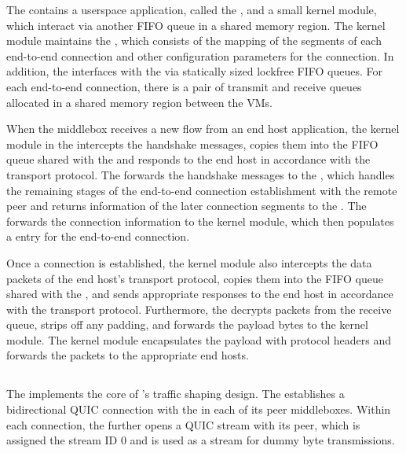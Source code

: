 The {\unshapedVM} contains a userspace application,
called the {\mediator}, and a small kernel module, which interact via another
FIFO queue in a shared memory region.
The kernel module maintains the {\flowmap}, which consists of the
mapping of the segments of each end-to-end connection and other configuration
parameters for the connection.
In addition, the {\mediator} interfaces with the {\shapedVM} via statically sized lockfree FIFO
queues. For each end-to-end connection, there is a pair of transmit and receive
queues allocated in a shared memory region between the VMs.

When the middlebox receives a new flow from an end host application, the kernel
module in the {\unshapedVM} intercepts the handshake messages, copies them into
the FIFO queue shared with the {\mediator} and responds to the end host in
accordance with the transport protocol.  The {\mediator} forwards the handshake
messages to the {\shapedVM}, which handles the remaining stages of the
end-to-end connection establishment with the remote peer and returns information
of the later connection segments to the {\mediator}. The {\mediator} forwards
the connection information to the kernel module, which then populates a
{\flowmap} entry for the end-to-end connection.

Once a connection is established, the kernel module also intercepts the data
packets of the end host's transport protocol, copies them into the FIFO queue
shared with the {\mediator}, and sends appropriate responses to the end host in
accordance with the transport protocol.
Furthermore, the {\mediator} decrypts packets from the receive queue, strips off
any padding, and forwards the payload bytes to the kernel module. The kernel
module encapsulates the payload with protocol headers and forwards
the packets to the appropriate end hosts.

\subsection{\shapedVM}
The {\shapedVM} implements the core of {\sys}'s traffic shaping design.
The {\shapedVM} establishes a bidirectional QUIC connection with the
{\shapedVM} in each of its peer middleboxes. Within each connection, the
{\shapedVM} further opens a  QUIC stream with its peer,
which is assigned the stream ID 0 and is used as a stream for dummy byte
transmissions.
\fi

